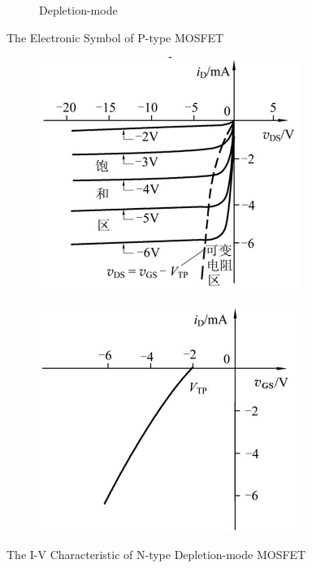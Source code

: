 \begin{figure}[H]
\begin{subfigure}{.3\textwidth}
    \caption{Depletion-mode}
    \label{fig:}
  \end{subfigure}
  \caption{The Electronic Symbol of P-type MOSFET}
  \label{fig:}
\end{figure}

\begin{figure}[H]
  \centering
  \begin{subfigure}{.3\textwidth}
    \centering
    \includegraphics[width=\linewidth]{figures/PMOSIV1}
    \label{fig:}
  \end{subfigure}%
  \begin{subfigure}{.3\textwidth}
    \centering
    \includegraphics[width=\linewidth]{figures/PMOSIV2}
    \label{fig:}
  \end{subfigure}
  \caption{The I-V Characteristic of N-type Depletion-mode MOSFET}
  \label{fig:}
\end{figure}

